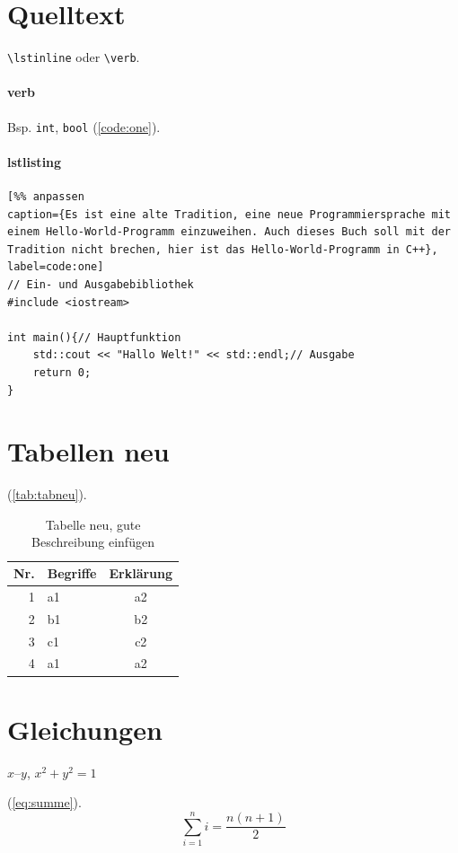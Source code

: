\section{Quelltext}
\verb|\lstinline| oder \verb|\verb|.

\paragraph{verb}
Bsp. \verb|int|, \verb|bool| (\autoref{code:one}).

\paragraph{lstlisting}

\lstset{language=C++}%
\begin{lstlisting}[%% anpassen
caption={Es ist eine alte Tradition, eine neue Programmiersprache mit einem Hello-World-Programm einzuweihen. Auch dieses Buch soll mit der Tradition nicht brechen, hier ist das Hello-World-Programm in C++}, label=code:one]
// Ein- und Ausgabebibliothek
#include <iostream>

int main(){// Hauptfunktion
	std::cout << "Hallo Welt!" << std::endl;// Ausgabe
	return 0;
}
\end{lstlisting}

\section{Tabellen neu}

(\autoref{tab:tabneu}).
\begin{table}[!ht]%
	\centering 
	\caption{Tabelle neu, gute Beschreibung einfügen}\label{tab:tabneu}%
	\begin{tabular}{@{}rlc@{}}
	\toprule 
    \textbf{Nr.} & \textbf{Begriffe} & \textbf{Erklärung}\\
	\midrule
    1 & a1 & a2\\
    2 & b1 & b2\\
    3 & c1 & c2\\
    4 & a1 & a2\\
	\bottomrule
 	\end{tabular}
\end{table}


\section{Gleichungen}

$x$--$y$, \( x^2 + y^2 = 1 \)

(\autoref{eq:summe}).
\begin{equation}\label{eq:summe}%
	\sum \limits_{i=1}^n i = \frac{n(n+1)}{2}
\end{equation}



